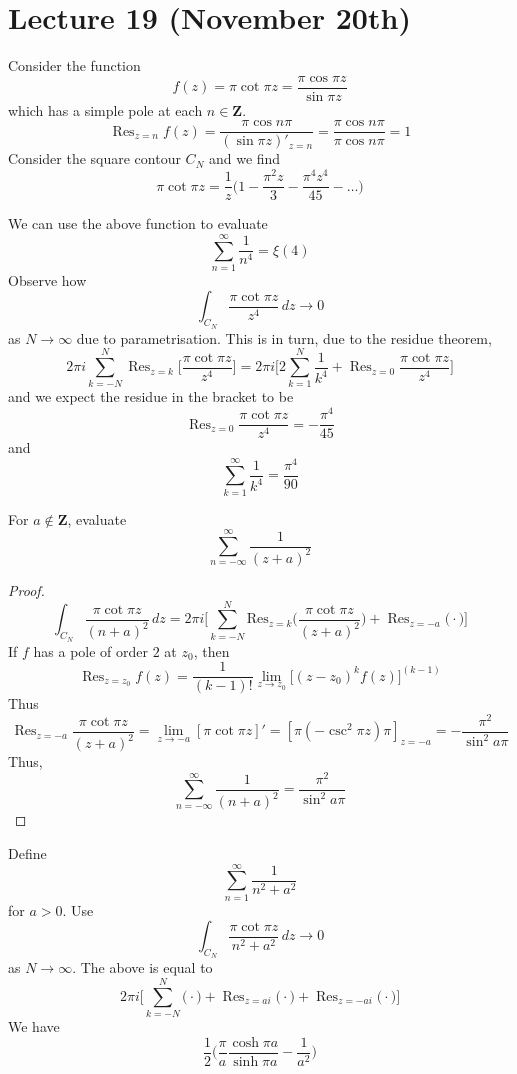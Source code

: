 \section{Lecture 19 (November 20th)}
\begin{rmk}
Consider the function
\[f(z)=\pi \cot \pi z=\dfrac{\pi \cos \pi z}{\sin \pi z}\]
which has a simple pole at each $n\in {\bm Z}$. 
\[\mathop{\mathrm{Res}}_{z=n}f(z)=\dfrac{\pi \cos n\pi }{(\sin \pi z)'_{z=n}}=\dfrac{\pi \cos n\pi }{\pi \cos n\pi }=1\]
Consider the square contour $C_{N}$ and we find
\[\pi \cot \pi z=\dfrac{1}{z}\Big(1-\dfrac{\pi ^2z}{3}-\dfrac{\pi ^{4}z^{4}}{45}-\ldots \Big)\]
\end{rmk}
\vspace{2ex}
\begin{ex}
We can use the above function to evaluate 
\[\sum ^{\infty }_{n=1}\dfrac{1}{n^{4}}=\xi (4)\]
Observe how
\[\int _{C_{N}}\dfrac{\pi \cot \pi z}{z^{4}}\,dz\rightarrow 0\]
as $N\rightarrow \infty $ due to parametrisation. This is in turn, due to the residue theorem,
\[2\pi i\sum ^{N}_{k=-N}\mathop{\mathrm{Res}}_{z=k}\Big[\dfrac{\pi \cot \pi z}{z^{4}}\Big]=2\pi i\Big[2\sum ^{N}_{k=1}\dfrac{1}{k^{4}}+\mathop{\mathrm{Res}}_{z=0}\dfrac{\pi \cot \pi z}{z^{4}}\Big]\]
and we expect the residue in the bracket to be
\[\mathop{\mathrm{Res}}_{z=0}\dfrac{\pi \cot \pi z}{z^{4}}=-\dfrac{\pi ^{4}}{45}\]
and
\[\sum _{k=1}^{\infty }\dfrac{1}{k^{4}}=\dfrac{\pi ^{4}}{90}\]
\end{ex}
\vspace{2ex}
\begin{ex}
For $a\notin {\bm Z}$, evaluate 
\[\sum ^{\infty }_{n=-\infty }\dfrac{1}{(z+a)^2}\]
\end{ex}
\vspace{2ex}
\begin{proof}
\[\int _{C_{N}}\dfrac{\pi \cot \pi z}{(n+a)^2}\,dz=2\pi i\Big[\sum _{k=-N}^{N}\mathrm{Res}_{z=k}\Big(\dfrac{\pi \cot \pi z}{(z+a)^2}\Big)+\mathop{\mathrm{Res}}_{z=-a}\Big(\cdot \Big)\Big]\]
If $f$ has a pole of order $2$ at $z_0$, then 
\[\mathop{\mathrm{Res}}_{z=z_0}f(z)=\dfrac{1}{(k-1)!}\lim _{z\rightarrow z_0}\Big[(z-z_0)^{k}f(z)\Big]^{(k-1)}\]
Thus 
\[\mathop{\mathrm{Res}}_{z=-a}\dfrac{\pi \cot \pi z}{(z+a)^2}=\lim _{z\rightarrow -a}[\pi \cot \pi z]'=[\pi (-\csc ^2\pi z)\pi ]_{z=-a}=-\dfrac{\pi ^2}{\sin ^2a\pi }\]
Thus,
\[\sum ^{\infty }_{n=-\infty }\dfrac{1}{(n+a)^2}=\dfrac{\pi ^2}{\sin ^2a\pi }\]
\end{proof}
\vspace{2ex}
\begin{ex}
Define
\[\sum ^{\infty }_{n=1}\dfrac{1}{n^2+a^2}\]
for $a>0$. Use 
\[\int _{C_{N}}\dfrac{\pi \cot \pi z}{n^2+a^2}\,dz\rightarrow 0\]
as $N\rightarrow \infty $. The above is equal to 
\[2\pi i\Big[\sum ^{N}_{k=-N}\Big(\cdot \Big)+\mathop{\mathrm{Res}}_{z=ai}\Big(\cdot \Big)+\mathop{\mathrm{Res}}_{z=-ai}\Big(\cdot \Big)\Big]\]
We have
\[\dfrac{1}{2}\Big(\dfrac{\pi }{a}\dfrac{\cosh \pi a}{\sinh \pi a}-\dfrac{1}{a^2}\Big)\]
\end{ex}
